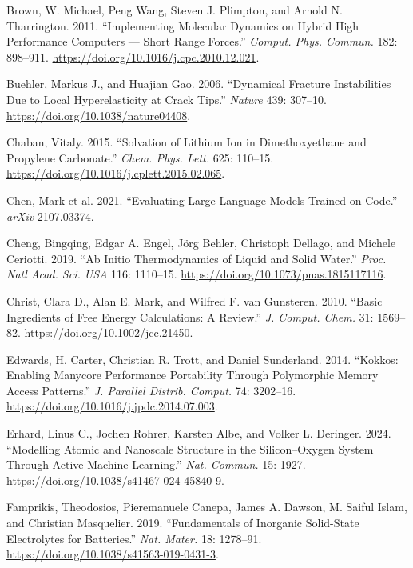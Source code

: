 \documentclass[
  11pt,
]{article}
\newlength{\cslhangindent}
\newenvironment{CSLReferences}[2] %
 {\begin{list}{}{%
  \setlength{\itemindent}{0pt}
  \setlength{\leftmargin}{0pt}
  \setlength{\parsep}{0pt}
  \ifodd #1
   \setlength{\leftmargin}{\cslhangindent}
   \setlength{\itemindent}{-1\cslhangindent}
  \fi
  \setlength{\itemsep}{#2\baselineskip}}}
 {\end{list}}
\begin{document}
\begin{CSLReferences}{1}{1}
Brown, W. Michael, Peng Wang, Steven J. Plimpton, and Arnold N.
Tharrington. 2011. {``Implementing Molecular Dynamics on Hybrid High
Performance Computers --- Short Range Forces.''} \emph{Comput. Phys.
Commun.} 182: 898--911. \url{https://doi.org/10.1016/j.cpc.2010.12.021}.

Buehler, Markus J., and Huajian Gao. 2006. {``Dynamical Fracture
Instabilities Due to Local Hyperelasticity at Crack Tips.''}
\emph{Nature} 439: 307--10. \url{https://doi.org/10.1038/nature04408}.

Chaban, Vitaly. 2015. {``Solvation of Lithium Ion in Dimethoxyethane and
Propylene Carbonate.''} \emph{Chem. Phys. Lett.} 625: 110--15.
\url{https://doi.org/10.1016/j.cplett.2015.02.065}.

{Chen, Mark et al.} 2021. {``Evaluating Large Language Models Trained on
Code.''} \emph{arXiv} 2107.03374.

Cheng, Bingqing, Edgar A. Engel, Jörg Behler, Christoph Dellago, and
Michele Ceriotti. 2019. {``Ab Initio Thermodynamics of Liquid and Solid
Water.''} \emph{Proc. Natl Acad. Sci. USA} 116: 1110--15.
\url{https://doi.org/10.1073/pnas.1815117116}.

Christ, Clara D., Alan E. Mark, and Wilfred F. van Gunsteren. 2010.
{``Basic Ingredients of Free Energy Calculations: A Review.''} \emph{J.
Comput. Chem.} 31: 1569--82. \url{https://doi.org/10.1002/jcc.21450}.

Edwards, H. Carter, Christian R. Trott, and Daniel Sunderland. 2014.
{``Kokkos: Enabling Manycore Performance Portability Through Polymorphic
Memory Access Patterns.''} \emph{J. Parallel Distrib. Comput.} 74:
3202--16. \url{https://doi.org/10.1016/j.jpdc.2014.07.003}.

Erhard, Linus C., Jochen Rohrer, Karsten Albe, and Volker L. Deringer.
2024. {``Modelling Atomic and Nanoscale Structure in the Silicon--Oxygen
System Through Active Machine Learning.''} \emph{Nat. Commun.} 15: 1927.
\url{https://doi.org/10.1038/s41467-024-45840-9}.

Famprikis, Theodosios, Pieremanuele Canepa, James A. Dawson, M. Saiful
Islam, and Christian Masquelier. 2019. {``Fundamentals of Inorganic
Solid-State Electrolytes for Batteries.''} \emph{Nat. Mater.} 18:
1278--91. \url{https://doi.org/10.1038/s41563-019-0431-3}.


\end{CSLReferences}
\end{document}
